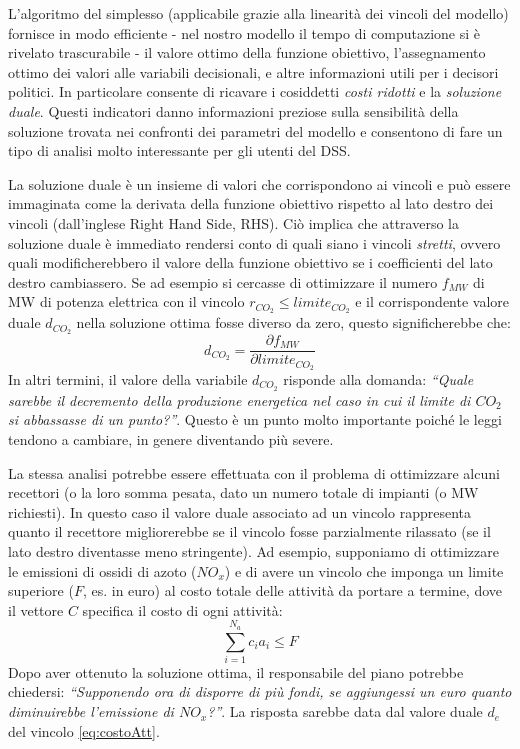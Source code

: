 
L'algoritmo del simplesso (applicabile grazie alla linearità dei vincoli del modello) fornisce in modo efficiente - nel nostro modello il tempo di computazione si è rivelato trascurabile - il valore ottimo della funzione obiettivo, l'assegnamento ottimo dei valori alle variabili decisionali, e altre informazioni utili per i decisori politici. In particolare consente di ricavare i cosiddetti \emph{costi ridotti} e la \emph{soluzione duale}. Questi indicatori danno informazioni preziose sulla sensibilità della soluzione trovata nei confronti dei parametri del modello e consentono di fare un tipo di analisi molto interessante per gli utenti del DSS.

La soluzione duale è un insieme di valori che corrispondono ai vincoli e può essere immaginata come la derivata della funzione obiettivo rispetto al lato destro dei vincoli (dall'inglese Right Hand Side, RHS). Ciò implica che attraverso la soluzione duale è immediato rendersi conto di quali siano i vincoli \emph{stretti}, ovvero quali modificherebbero il valore della funzione obiettivo se i coefficienti del lato destro cambiassero. Se ad esempio si cercasse di ottimizzare il numero $f_{MW}$ di MW di potenza elettrica con il vincolo $r_{CO_2} \leq limite_{CO_2}$ e il corrispondente valore duale $d_{CO_2}$ nella soluzione ottima fosse diverso da zero, questo significherebbe che:
\begin{equation}
\label{eq:sensAnal}
	d_{CO_2} = \frac{\partial f_{MW}}{\partial limite_{CO_2}}
\end{equation}
In altri termini, il valore della variabile $d_{CO_2}$ risponde alla domanda: \emph{``Quale sarebbe il decremento della produzione energetica nel caso in cui il limite di $CO_2$ si abbassasse di un punto?''}. Questo è un punto molto importante poiché le leggi tendono a cambiare, in genere diventando più severe. 

La stessa analisi potrebbe essere effettuata con il problema di ottimizzare alcuni recettori (o la loro somma pesata, dato un numero totale di impianti (o MW richiesti). In questo caso il valore duale associato ad un vincolo rappresenta quanto il recettore migliorerebbe se il vincolo fosse parzialmente rilassato (se il lato destro diventasse meno stringente). Ad esempio, supponiamo di ottimizzare le emissioni di ossidi di azoto ($NO_x$) e di avere un vincolo che imponga un limite superiore ($F$, es. in euro) al costo totale delle attività da portare a termine, dove il vettore $C$ specifica il costo di ogni attività: 
\begin{equation}
\label{eq:costoAtt}
	\sum_{i=1}^{N_a} c_i a_i \leq F
\end{equation}
Dopo aver ottenuto la soluzione ottima, il responsabile del piano potrebbe chiedersi: \emph{``Supponendo ora di disporre di più fondi, se aggiungessi un euro quanto diminuirebbe l'emissione di $NO_x$?''}. La risposta sarebbe data dal valore duale $d_e$ del vincolo \ref{eq:costoAtt}.


